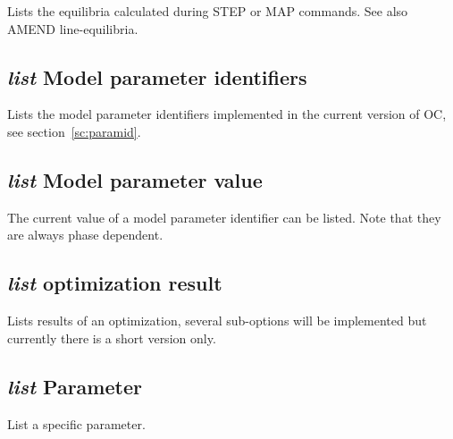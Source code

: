 \documentclass[12pt]{article}
\begin{document}
Lists the equilibria calculated during STEP or MAP commands.  See also
AMEND line-equilibria.


\subsection{{\em list} Model parameter identifiers}

Lists the model parameter identifiers implemented in the current
version of OC, see section~\ref{sc:paramid}.

\subsection{{\em list} Model parameter value}

The current value of a model parameter identifier can be listed.  Note
that they are always phase dependent.

\subsection{{\em list} optimization result}

Lists results of an optimization, several sub-options will be
implemented but currently there is a short version only.

\subsection{{\em list} Parameter}

List a specific parameter.

\end{document}
